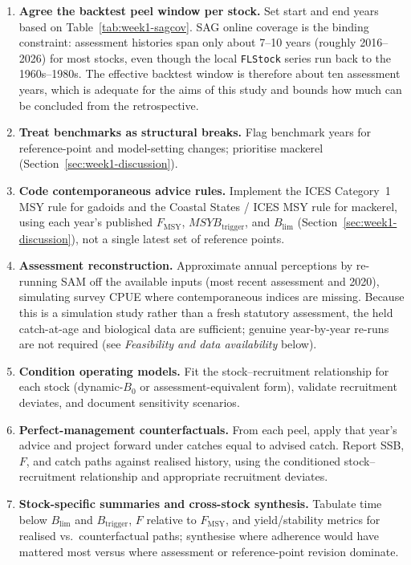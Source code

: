 \documentclass[11pt,a4paper]{extarticle}
\begin{document}
\begin{enumerate}
  \item \textbf{Agree the backtest peel window per stock.}
        Set start and end years based on Table~\ref{tab:week1-sagcov}. SAG
        online coverage is the binding constraint: assessment histories span
        only about 7--10 years (roughly 2016--2026) for most stocks, even
        though the local \texttt{FLStock} series run back to the 1960s--1980s.
        The effective backtest window is therefore about ten assessment years,
        which is adequate for the aims of this study and bounds how much can be
        concluded from the retrospective.
  \item \textbf{Treat benchmarks as structural breaks.}
        Flag benchmark years for reference-point and model-setting changes;
        prioritise mackerel (Section~\ref{sec:week1-discussion}).
  \item \textbf{Code contemporaneous advice rules.}
		Implement the ICES Category~1 MSY rule for gadoids and the Coastal
		States / ICES MSY rule for mackerel, using each year's published
		\(F_{\mathrm{MSY}}\), \(MSYB_{\mathrm{trigger}}\), and \(B_{\lim}\)
		(Section~\ref{sec:week1-discussion}), not a single latest set of
		reference points.
  \item \textbf{Assessment reconstruction.}
        Approximate annual perceptions by re-running SAM off the available
        inputs (most recent assessment and 2020), simulating survey CPUE where
        contemporaneous indices are missing. Because this is a simulation study
        rather than a fresh statutory assessment, the held catch-at-age and
        biological data are sufficient; genuine year-by-year re-runs are not
        required (see \emph{Feasibility and data availability} below).

  \item \textbf{Condition operating models.}
        Fit the stock--recruitment relationship for each stock (dynamic-\(B_0\)
        or assessment-equivalent form), validate recruitment deviates, and
        document sensitivity scenarios.
  \item \textbf{Perfect-management counterfactuals.}
        From each peel, apply that year's advice and project forward under
        catches equal to advised catch. Report SSB, \(F\), and catch paths
        against realised history, using the conditioned stock--recruitment
        relationship and appropriate recruitment deviates.

  \item \textbf{Stock-specific summaries and cross-stock synthesis.}
        Tabulate time below \(B_{\lim}\) and \(B_{\mathrm{trigger}}\),
        \(F\) relative to \(F_{\mathrm{MSY}}\), and yield/stability metrics for
        realised vs.\ counterfactual paths; synthesise where adherence would
        have mattered most versus where assessment or reference-point revision
        dominate.
\end{enumerate}
\end{document}
